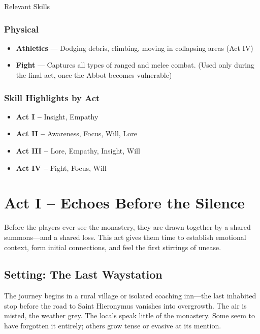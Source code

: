 \documentclass[nodeprecatedcode,bg=print]{dndbook/dndbook}
\begin{document}
\begin{WyrdSidebar}{Relevant Skills}
    \subsubsection*{Physical}
    \begin{itemize}
        \item \textbf{Athletics} — Dodging debris, climbing, moving in collapsing areas (Act IV)
        \item \textbf{Fight} — Captures all types of ranged and melee combat. (Used only during the final act, once the Abbot becomes vulnerable)
    \end{itemize}
    
    \subsubsection*{Skill Highlights by Act}
    \begin{itemize}
        \item \textbf{Act I –} Insight, Empathy
        \item \textbf{Act II –} Awareness, Focus, Will, Lore
        \item \textbf{Act III –} Lore, Empathy, Insight, Will
        \item \textbf{Act IV –} Fight, Focus, Will
    \end{itemize}    
\end{WyrdSidebar}
    

\section*{Act I – Echoes Before the Silence}

Before the players ever see the monastery, they are drawn together by a shared summons—and a shared loss. This act gives them time to establish emotional context, form initial connections, and feel the first stirrings of unease.

\subsection*{Setting: The Last Waystation}

The journey begins in a rural village or isolated coaching inn—the last inhabited stop before the road to Saint Hieronymus vanishes into overgrowth. The air is misted, the weather grey. The locals speak little of the monastery. Some seem to have forgotten it entirely; others grow tense or evasive at its mention.
\end{document}
